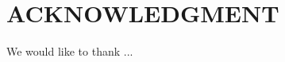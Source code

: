 \documentclass[letterpaper, 10 pt, conference]{ieeeconf}  %
\begin{document}
\addtolength{\textheight}{-10cm}   %

\section*{ACKNOWLEDGMENT}

We would like to thank ... 





\end{document}
